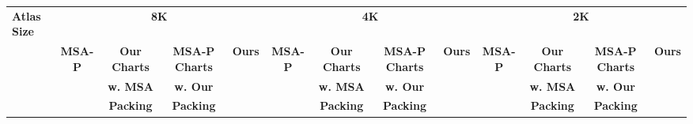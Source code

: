 \begin{table*}[t]
\scriptsize
\setlength{\tabcolsep}{3pt}
\centering
\begin{tabular}{l cccc|cccc|cccc}
	\textbf{Atlas   Size} & \multicolumn{4}{c|}{\textbf{8K}}                            & \multicolumn{4}{c|}{\textbf{4K}}                                                  & \multicolumn{4}{c}{\textbf{2K}}                                                  \\
	& \textbf{MSA-P} & \textbf{Our Charts} & \textbf{MSA-P Charts}   & \textbf{Ours} & \textbf{MSA-P} & \textbf{Our Charts} & \textbf{MSA-P Charts}   & \textbf{Ours} & \textbf{MSA-P} & \textbf{Our Charts} & \textbf{MSA-P Charts}   & \textbf{Ours}\\
	& \textbf{}      & \textbf{w. MSA}   & \textbf{w. Our} & \textbf{}     & \textbf{}      & \textbf{w. MSA}   & \textbf{w. Our} & \textbf{}     & \textbf{}      & \textbf{w. MSA}   & \textbf{w. Our} & \textbf{}     \\
	& \textbf{}      & \textbf{Packing}   & \textbf{Packing} & \textbf{}     & \textbf{}      & \textbf{Packing}   & \textbf{Packing} & \textbf{}     & \textbf{}      & \textbf{Packing}   & \textbf{Packing} & \textbf{}     \\


\end{tabular}
\end{table*}
